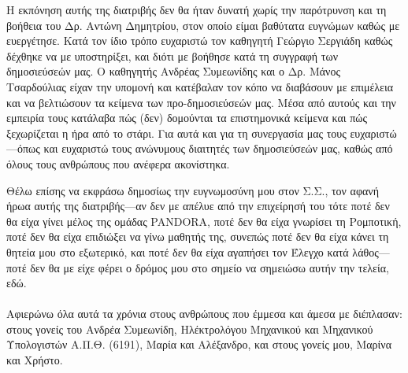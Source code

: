 
Η εκπόνηση αυτής της διατριβής δεν θα ήταν δυνατή χωρίς την παρότρυνση και τη
βοήθεια του Δρ. Αντώνη Δημητρίου, στον οποίο είμαι βαθύτατα ευγνώμων καθώς με
ευεργέτησε. Κατά τον ίδιο τρόπο ευχαριστώ τον καθηγητή Γεώργιο Σεργιάδη καθώς
δέχθηκε να με υποστηρίξει, και διότι με βοήθησε κατά τη συγγραφή των
δημοσιεύσεών μας. Ο καθηγητής Ανδρέας Συμεωνίδης και ο Δρ. Μάνος Τσαρδούλιας
είχαν την υπομονή και κατέβαλαν τον κόπο να διαβάσουν με επιμέλεια και να
βελτιώσουν τα κείμενα των προ-δημοσιεύσεών μας. Μέσα από αυτούς και την
εμπειρία τους κατάλαβα πώς (δεν) δομούνται τα επιστημονικά κείμενα και πώς
ξεχωρίζεται η ήρα από το στάρι. Για αυτά και για τη συνεργασία μας τους
ευχαριστώ---όπως και ευχαριστώ τους ανώνυμους διαιτητές των δημοσιεύσεών μας,
καθώς από όλους τους ανθρώπους που ανέφερα ακονίστηκα.

Θέλω επίσης να εκφράσω δημοσίως την ευγνωμοσύνη μου στον Σ.Σ., τον αφανή ήρωα
αυτής της διατριβής---αν δεν με απέλυε από την επιχείρησή του τότε ποτέ δεν θα
είχα γίνει μέλος της ομάδας PANDORA, ποτέ δεν θα είχα γνωρίσει τη Ρομποτική,
ποτέ δεν θα είχα επιδιώξει να γίνω μαθητής της, συνεπώς ποτέ δεν θα είχα κάνει
τη θητεία μου στο εξωτερικό, και ποτέ δεν θα είχα αγαπήσει τον Έλεγχο κατά
λάθος---ποτέ δεν θα με είχε φέρει ο δρόμος μου στο σημείο να σημειώσω αυτήν την
τελεία, εδώ.  \\ \\

Αφιερώνω όλα αυτά τα χρόνια στους ανθρώπους που έμμεσα και άμεσα με διέπλασαν:
στους γονείς του Ανδρέα Συμεωνίδη, Ηλέκτρολόγου Μηχανικού και Μηχανικού
Υπολογιστών Α.Π.Θ. (6191), Μαρία και Αλέξανδρο, και στους γονείς μου, Μαρίνα και
Χρήστο.

\afterpage{\blankpage}
\restoregeometry
\cleardoublepage
